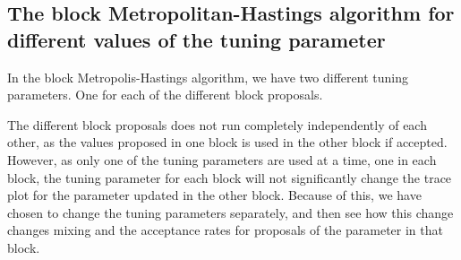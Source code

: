 

\subsection{The block Metropolitan-Hastings algorithm for different values of the tuning parameter}




In the block Metropolis-Hastings algorithm, we have two different tuning parameters. One for each of the different block proposals. 



The different block proposals does not run completely independently of each other, as the values proposed in one block is used in the other block if accepted. However, as only one of the tuning parameters are used at a time, one in each block, the tuning parameter for each block will not significantly change the trace plot for the parameter updated in the other block. Because of this, we have chosen to change the tuning parameters separately, and then see how this change changes mixing and the acceptance rates for proposals of the parameter in that block. 



